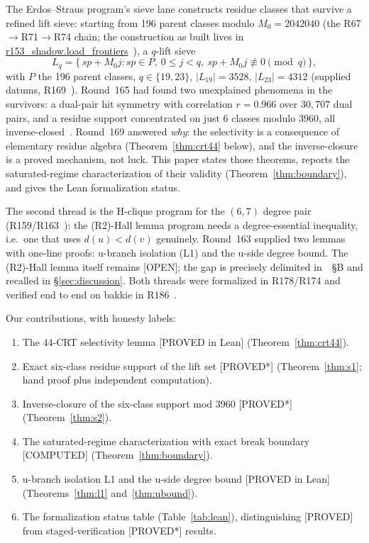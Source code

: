 \documentclass[11pt,a4paper]{article}
\theoremstyle{definition}
\begin{document}
The Erdos--Straus program's sieve lane constructs residue classes that
survive a refined lift sieve: starting from 196 parent classes modulo
$M_0=2042040$ (the R67$\to$R71$\to$R74 chain; the construction as built
lives in \url{r153_shadow.load_frontiers}~\cite{R153}),
a $q$-lift sieve
\begin{equation}
  \label{eq:sieve}
  L_q=\{\,sp+M_0j : sp\in P,\ 0\le j<q,\
       sp+M_0j\not\equiv0\pmod q\,\},
\end{equation}
with $P$ the 196 parent classes, $q\in\{19,23\}$,
$|L_{19}|=3528$, $|L_{23}|=4312$ (supplied datums, R169~\cite{R169}).
Round~165 had found two unexplained phenomena in the survivors: a
dual-pair hit symmetry with correlation $r=0.966$ over $30{,}707$ dual
pairs, and a residue support concentrated on just $6$ classes modulo
$3960$, all inverse-closed~\cite{R165}. Round~169 answered \emph{why}:
the selectivity is a consequence of elementary residue algebra
(Theorem~\ref{thm:crt44} below), and the inverse-closure is a proved
mechanism, not luck. This paper states those theorems, reports the
saturated-regime characterization of their validity
(Theorem~\ref{thm:boundary}), and gives the Lean formalization status.

The second thread is the H-clique program for the $(6,7)$ degree pair
(R159/R163~\cite{R159,R163}): the (R2)-Hall lemma program needs a
degree-essential inequality, i.e.\ one that uses $d(u)<d(v)$
genuinely. Round~163 supplied two lemmas with one-line proofs: u-branch
isolation (L1) and the u-side degree bound. The (R2)-Hall lemma itself
remains [OPEN]; the gap is precisely delimited in~\cite{R163}~\S B and
recalled in \S\ref{sec:discussion}. Both threads were formalized in
R178/R174 and verified end to end on bakkie in R186~\cite{R178,R174,R186}.

Our contributions, with honesty labels:
\begin{enumerate}
\item The 44-CRT selectivity lemma [PROVED in Lean]
  (Theorem~\ref{thm:crt44}).
\item Exact six-class residue support of the lift set [PROVED*]
  (Theorem~\ref{thm:s1}; hand proof plus independent computation).
\item Inverse-closure of the six-class support mod $3960$ [PROVED*]
  (Theorem~\ref{thm:s2}).
\item The saturated-regime characterization with exact break boundary
  [COMPUTED] (Theorem~\ref{thm:boundary}).
\item u-branch isolation L1 and the u-side degree bound [PROVED in Lean]
  (Theorems~\ref{thm:l1} and~\ref{thm:ubound}).
\item The formalization status table (Table~\ref{tab:lean}), distinguishing
  [PROVED] from staged-verification [PROVED*] results.
\end{enumerate}
\end{document}
